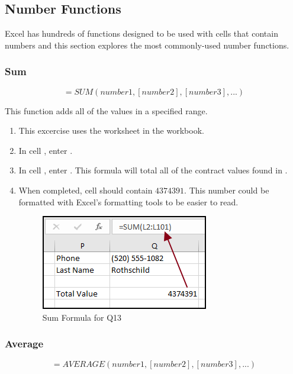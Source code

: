\subsection{Number Functions}

Excel has hundreds of functions designed to be used with cells that contain numbers and this section explores the most commonly-used number functions.

\subsubsection{Sum}

\[ =SUM(number1, [number2], [number3], ...) \]

This function adds all of the values in a specified range. 

\begin{enumerate}
	\item This excercise uses the  worksheet in the  workbook.
	\item In cell , enter .
	\item In cell , enter . This formula will total all of the contract values found in .
	\item When completed, cell  should contain $ 4374391 $. This number could be formatted with Excel's formatting tools to be easier to read.

	\begin{figure}[H]
		\centering
		\includegraphics[width=\maxwidth{.75\linewidth}]{gfx/ch09_fig38}
		\caption{Sum Formula for Q13}
		\label{09:fig38}
	\end{figure}
	
\end{enumerate}

\subsubsection{Average}

\[ =AVERAGE(number1, [number2], [number3], ...) \]

